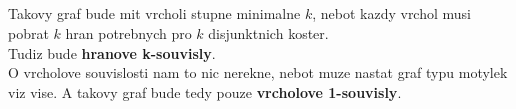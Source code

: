 \documentclass[a4paper]{article}
\begin{document}
\subsection{}
Takovy graf bude mit vrcholi stupne minimalne $k$, nebot kazdy vrchol musi pobrat $k$ hran potrebnych pro $k$ disjunktnich koster.\\
Tudiz bude \textbf{hranove k-souvisly}.\\
O vrcholove souvislosti nam to nic nerekne, nebot muze nastat graf typu motylek viz vise. A takovy graf bude tedy pouze \textbf{vrcholove 1-souvisly}.
 
\end{document}
